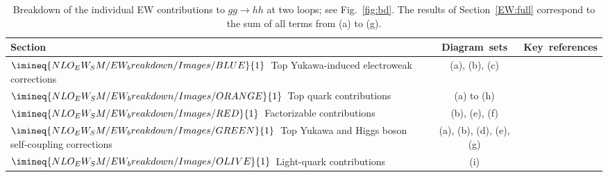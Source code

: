 \begin{table}
\begingroup
\small
\setlength{\tabcolsep}{2pt}
\begin{center}
\begin{tabularx}{\textwidth}{@{}
  >{\raggedright\arraybackslash}p{}
  c
  >{\raggedright\arraybackslash}X
@{}}
\toprule
Section & \mbox{Diagram sets} & \mbox{Key references} \\
\midrule
$\imineq{NLO_EW_SM/EW_breakdown/Images/BLUE}{1}$~Top Yukawa-induced electroweak corrections
  & (a), (b), (c)
  & \cite{Muhlleitner:2022ijf,Bhattacharya_TBA} \\

$\imineq{NLO_EW_SM/EW_breakdown/Images/ORANGE}{1}$~Top quark contributions
  & (a) to (h)
  & \cite{Davies:2023npk,Davies:2026wbx} \\

$\imineq{NLO_EW_SM/EW_breakdown/Images/RED}{1}$~Factorizable contributions
  & (b), (e), (f)
  & \cite{Muhlleitner:2022ijf,Zhang:2024rix} \\

$\imineq{NLO_EW_SM/EW_breakdown/Images/GREEN}{1}$~Top Yukawa and Higgs boson self-coupling corrections
  & (a), (b), (d), (e), (g)
  & \cite{Davies:2022ram,Davies:2025wke,Heinrich:2024dnz} \\

$\imineq{NLO_EW_SM/EW_breakdown/Images/OLIVE}{1}$~Light-quark contributions
  & (i)
  & \cite{Bonetti:2025vfd,Bhattacharya_TBA} \\
\bottomrule
\end{tabularx}
\caption{Breakdown of the individual EW contributions to $gg \to hh$ at two loops; see Fig.~\ref{fig:bd}. The results of Section~\ref{EW:full} correspond to the sum of all terms from (a) to (g).}
\label{tab:bd}
\end{center}
\endgroup
\end{table}










